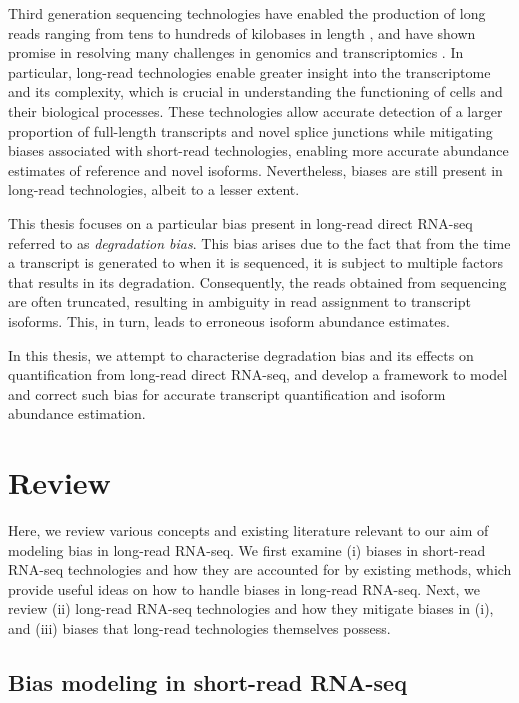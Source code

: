 
Third generation sequencing technologies have enabled the production of long reads ranging from tens to hundreds of kilobases in length \cite{Pollard2018}, and have shown promise in resolving many challenges in genomics and transcriptomics \cite{Bolisetty2015, Byrne2017, DeCoster2019, Liu2019, Mantere2019, Nurk2021}. In particular, long-read technologies enable greater insight into the transcriptome and its complexity, which is crucial in understanding the functioning of cells and their biological processes. These technologies allow accurate detection of a larger proportion of full-length transcripts and novel splice junctions while mitigating biases associated with short-read technologies, enabling more accurate abundance estimates of reference and novel isoforms. Nevertheless, biases are still present in long-read technologies, albeit to a lesser extent. 

This thesis focuses on a particular bias present in long-read direct RNA-seq referred to as \textit{degradation bias}. This bias arises due to the fact that from the time a transcript is generated to when it is sequenced, it is subject to multiple factors that results in its degradation. Consequently, the reads obtained from sequencing are often truncated, resulting in ambiguity in read assignment to transcript isoforms. This, in turn, leads to erroneous isoform abundance estimates. 

In this thesis, we attempt to characterise degradation bias and its effects on quantification from long-read direct RNA-seq, and develop a framework to model and correct such bias for accurate transcript quantification and isoform abundance estimation.

\section{Review}

Here, we review various concepts and existing literature relevant to our aim of modeling bias in long-read RNA-seq. We first examine (i) biases in short-read RNA-seq technologies and how they are accounted for by existing methods, which provide useful ideas on how to handle biases in long-read RNA-seq. Next, we review (ii) long-read RNA-seq technologies and how they mitigate biases in (i), and (iii) biases that long-read technologies themselves possess. 

\subsection{Bias modeling in short-read RNA-seq}

